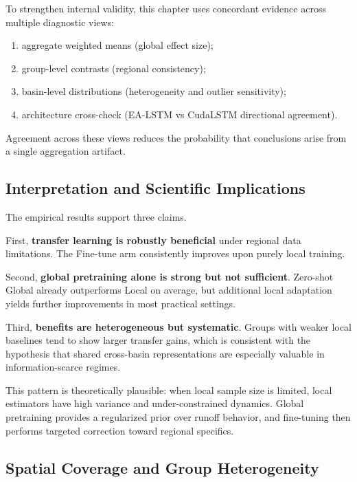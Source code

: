 \documentclass[
]{krantz}
\providecommand{\tightlist}{%
  \setlength{\itemsep}{0pt}\setlength{\parskip}{0pt}}
\begin{document}
To strengthen internal validity, this chapter uses concordant evidence across multiple
diagnostic views:

\begin{enumerate}
\def\labelenumi{\arabic{enumi}.}
\tightlist
\item
  aggregate weighted means (global effect size);
\item
  group-level contrasts (regional consistency);
\item
  basin-level distributions (heterogeneity and outlier sensitivity);
\item
  architecture cross-check (EA-LSTM vs CudaLSTM directional agreement).
\end{enumerate}

Agreement across these views reduces the probability that conclusions arise from a
single aggregation artifact.

\subsection{Interpretation and Scientific Implications}\label{interpretation-and-scientific-implications}

The empirical results support three claims.

First, \textbf{transfer learning is robustly beneficial} under regional data limitations.
The Fine-tune arm consistently improves upon purely local training.

Second, \textbf{global pretraining alone is strong but not sufficient}. Zero-shot Global
already outperforms Local on average, but additional local adaptation yields further
improvements in most practical settings.

Third, \textbf{benefits are heterogeneous but systematic}. Groups with weaker local baselines
tend to show larger transfer gains, which is consistent with the hypothesis that shared
cross-basin representations are especially valuable in information-scarce regimes.

This pattern is theoretically plausible: when local sample size is limited, local
estimators have high variance and under-constrained dynamics. Global pretraining
provides a regularized prior over runoff behavior, and fine-tuning then performs
targeted correction toward regional specifics.

\subsection{Spatial Coverage and Group Heterogeneity}\label{spatial-coverage-and-group-heterogeneity}
\end{document}
